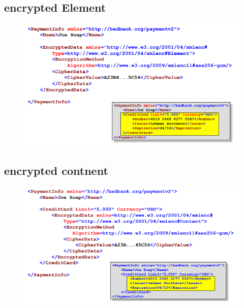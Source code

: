 \subsection{encrypted Element}
\begin{figure}[H]
	\begin{center}
		\includegraphics[scale=0.8]{Resources/XmlEncrypt2}
		\caption{}
		\label{fig:XmlEncrypt2}
	\end{center}
\end{figure}

\subsection{encrypted contnent}
\begin{figure}[H]
	\begin{center}
		\includegraphics[scale=0.8]{Resources/XmlEncrypt3}
		\caption{}
		\label{fig:XmlEncrypt3}
	\end{center}
\end{figure}

